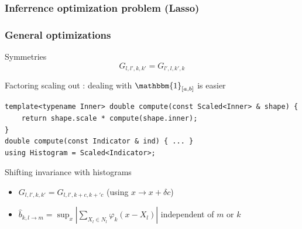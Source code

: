 \documentclass{beamer}
\newcommand\D{\mathrm{d}}
\newcommand\R{\mathbbm{R}}
\newcommand\Indicator[1]{\mathbbm{1}_{#1}}
\DeclareMathOperator*{\argmin}{arg\,min}
\begin{document}
\begin{frame}\frametitle{Inferrence optimization problem (Lasso)}
\end{frame}

\begin{frame}[fragile]\frametitle{General optimizations}
    Symmetries
    \[ G_{l,l',k,k'} = G_{l',l,k',k} \]
    
    Factoring scaling out : dealing with $\Indicator{[a,b]}$ is easier
    \begin{verbatim}
template<typename Inner> double compute(const Scaled<Inner> & shape) {
    return shape.scale * compute(shape.inner);
}
double compute(const Indicator & ind) { ... }
using Histogram = Scaled<Indicator>;
    \end{verbatim}
    
    Shifting invariance with histograms
    \begin{itemize}
        \item $G_{l,l',k,k'} = G_{l,l',k+c,k+'c}$ (using $x \rightarrow x + \delta c$)
        \item $\widehat{b}_{k,l \rightarrow m} = \sup_x \left|\sum_{X_l \in N_l} \varphi_k(x - X_l) \right|$ independent of $m$ or $k$
    \end{itemize}
\end{frame}
\end{document}
